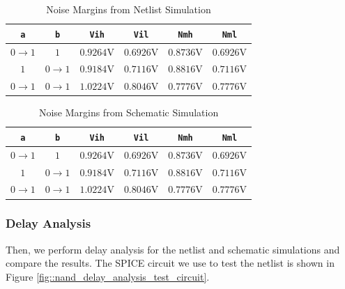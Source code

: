\documentclass{article}
\begin{document}
	\begin{table}[H]
	\begin{center}
	\caption{Noise Margins from Netlist Simulation}
	\label{table::nand_gate_noise_analysis}
	\begin{tabular}{| c | c | c | c | c | c |}
		\hline
		\texttt{a} & \texttt{b} & \texttt{Vih} & \texttt{Vil} & \texttt{Nmh} & \texttt{Nml} \\
		\hline	
		$0 \rightarrow 1$ & $1$ & $0.9264 \text{V}$ & $0.6926 \text{V}$ & $0.8736 \text{V}$ & $0.6926 \text{V}$\\
		\hline	
		$1$ & $0 \rightarrow 1$ & $0.9184 \text{V}$ & $0.7116 \text{V}$ & $0.8816 \text{V}$ & $0.7116 \text{V}$\\
		\hline	
		$0 \rightarrow 1$ & $0 \rightarrow 1$ & $1.0224 \text{V}$ & $0.8046 \text{V}$ & $0.7776 \text{V}$ & $0.7776 \text{V}$\\
		\hline
	\end{tabular}
	\end{center}
	\end{table}
	
	\begin{table}[H]
	\begin{center}
	\caption{Noise Margins from Schematic Simulation}
	\label{table::nand_gate_noise_analysis_schem}
	\begin{tabular}{| c | c | c | c | c | c |}
		\hline
		\texttt{a} & \texttt{b} & \texttt{Vih} & \texttt{Vil} & \texttt{Nmh} & \texttt{Nml} \\
		\hline	
		$0 \rightarrow 1$ & $1$ & $0.9264 \text{V}$ & $0.6926 \text{V}$ & $0.8736 \text{V}$ & $0.6926 \text{V}$\\
		\hline	
		$1$ & $0 \rightarrow 1$ & $0.9184 \text{V}$ & $0.7116 \text{V}$ & $0.8816 \text{V}$ & $0.7116 \text{V}$\\
		\hline	
		$0 \rightarrow 1$ & $0 \rightarrow 1$ & $1.0224 \text{V}$ & $0.8046 \text{V}$ & $0.7776 \text{V}$ & $0.7776 \text{V}$\\
		\hline
	\end{tabular}
	\end{center}
	\end{table}
	
	\subsubsection{Delay Analysis}
	
	Then, we perform delay analysis for the netlist and schematic simulations and compare the results. The SPICE circuit we use to test the netlist is shown in Figure \ref{fig::nand_delay_analysis_test_circuit}.
	
\end{document}
